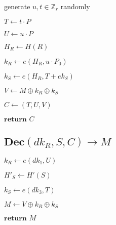 \documentclass[a4paper]{article}
\begin{document}
generate $u, t \in \mathbb{Z}_r$ randomly

$T \gets t \cdot P$

$U \gets u \cdot P$

$H_R \gets H(R)$

$k_R \gets e(H_R, u \cdot P_0)$

$k_S \gets e(H_R, T + \textit{ek}_S)$

$V \gets M \oplus k_R \oplus k_S$

$C \gets (T, U, V)$

$\textbf{return }C$	

\subsection{$\textbf{Dec}(\textit{dk}_R, S, C) \rightarrow M$}

$k_R \gets e(\textit{dk}_1, U)$

$H'_S \gets H'(S)$

$k_S \gets e(\textit{dk}_3, T)$

$M \gets V \oplus k_R \oplus k_S$

$\textbf{return }M$
\end{document}

